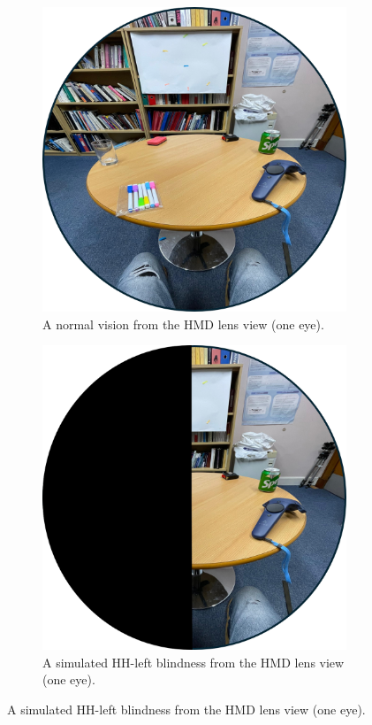 \documentclass{l4proj}
\begin{document}
\begin{figure}[!h]
    \centering
    \begin{subfigure}[b]{0.4\textwidth}
        \includegraphics[width=\textwidth]{images/test_normalVision.png}
        \caption{A normal vision from the HMD lens view (one eye).}
    \end{subfigure}
    \hfill
    \begin{subfigure}[b]{0.4\textwidth}
        \includegraphics[width=\textwidth]{images/test_simulatedVision.png}    
        \caption{A simulated HH-left blindness from the HMD lens view (one eye).}
    \end{subfigure}
    

\end{figure}
\end{document}
